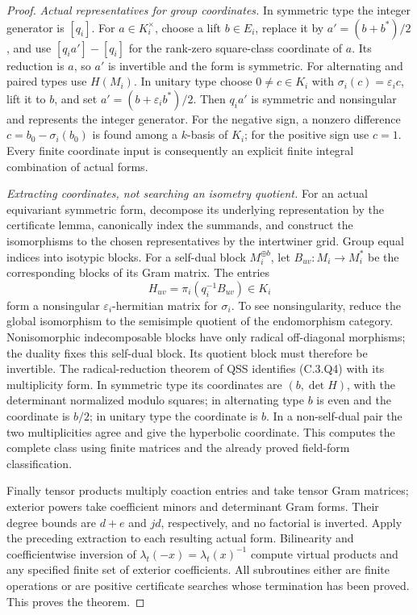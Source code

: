 \begin{proof}
\emph{Actual representatives for group coordinates.}
In symmetric type the integer generator is $[q_i]$. For
$a\in K_i^\times$, choose a lift $b\in E_i$, replace it by
$a'=(b+b^*)/2$, and use
$[q_i a']-[q_i]$ for the rank-zero square-class coordinate of $a$.
Its reduction is $a$, so $a'$ is invertible and the form is symmetric.
For alternating and paired types use $H(M_i)$. In unitary type choose
$0\ne c\in K_i$ with $\sigma_i(c)=\varepsilon_i c$, lift it to $b$,
and set $a'=(b+\varepsilon_i b^*)/2$. Then $q_i a'$ is symmetric and
nonsingular and represents the integer generator. For the negative
sign, a nonzero difference $c=b_0-\sigma_i(b_0)$ is found among a
$k$-basis of $K_i$; for the positive sign use $c=1$.
Every finite coordinate input is consequently an explicit finite
integral combination of actual forms.

\emph{Extracting coordinates, not searching an isometry quotient.}
For an actual equivariant symmetric form, decompose its underlying
representation by the certificate lemma, canonically index the summands,
and construct the isomorphisms to the chosen representatives by the
intertwiner grid. Group equal indices into isotypic blocks. For a
self-dual block $M_i^{\oplus b}$, let $B_{uv}:M_i\to M_i^*$ be
the corresponding blocks of its Gram matrix. The entries
\[
        H_{uv}=\pi_i(q_i^{-1}B_{uv})\in K_i              \tag{C.3.Q4}
\]
form a nonsingular $\varepsilon_i$-hermitian matrix for $\sigma_i$.
To see nonsingularity, reduce the global isomorphism to the semisimple
quotient of the endomorphism category. Nonisomorphic indecomposable
blocks have only radical off-diagonal morphisms; the duality fixes this
self-dual block. Its quotient block must therefore be invertible.
The radical-reduction theorem of QSS identifies (C.3.Q4) with its
multiplicity form. In symmetric type its coordinates are
$(b,\det H)$, with the determinant normalized modulo squares; in
alternating type $b$ is even and the coordinate is $b/2$; in unitary
type the coordinate is $b$. In a non-self-dual pair the two
multiplicities agree and give the hyperbolic coordinate. This computes
the complete class using finite matrices and the already proved
field-form classification.

Finally tensor products multiply coaction entries and take tensor Gram
matrices; exterior powers take coefficient minors and determinant Gram
forms. Their degree bounds are $d+e$ and $jd$, respectively, and no
factorial is inverted. Apply the preceding extraction to each resulting
actual form. Bilinearity and coefficientwise inversion of
$\lambda_t(-x)=\lambda_t(x)^{-1}$ compute virtual products and any
specified finite set of exterior coefficients. All subroutines either
are finite operations or are positive certificate searches whose
termination has been proved. This proves the theorem.
\end{proof}


